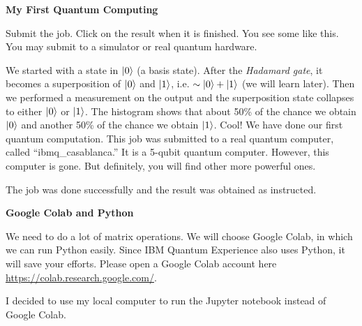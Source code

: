 \documentclass[a4paper, 10pt]{article}
\begin{document}
\begin{problem}
\textbf{My First Quantum Computing}
\par Submit the job. Click on the result when it is finished. You see some like this.
You may submit to a simulator or real quantum hardware.


We started with a state in \( \ket{0} \) (a basis state).
After the \textit{Hadamard gate}, it becomes a superposition of \( \ket{0} \) and \( \ket{1} \), i.e. \( \sim \ket{0} + \ket{1} \) (we will learn later).
Then we performed a measurement on the output and the superposition state collapses to either \( \ket{0} \) or \( \ket{1} \).
The histogram shows that about 50\% of the chance we obtain \( \ket{0} \) and another 50\% of the chance we obtain \( \ket{1} \).
Cool! We have done our first quantum computation.
This job was submitted to a real quantum computer, called ``ibmq\_casablanca.''
It is a 5-qubit quantum computer. However, this computer is gone.
But definitely, you will find other more powerful ones.
\end{problem}

\begin{solution}
	The job was done successfully and the result was obtained as instructed.
\end{solution}

\begin{problem}
\textbf{Google Colab and Python}
\par We need to do a lot of matrix operations. We will choose Google Colab, in which we can run Python easily.
Since IBM Quantum Experience also uses Python, it will save your efforts.
Please open a Google Colab account here \url{https://colab.research.google.com/}.
\end{problem}

\begin{solution}
	I decided to use my local computer to run the Jupyter notebook instead of Google Colab.
\end{solution}
\end{document}
